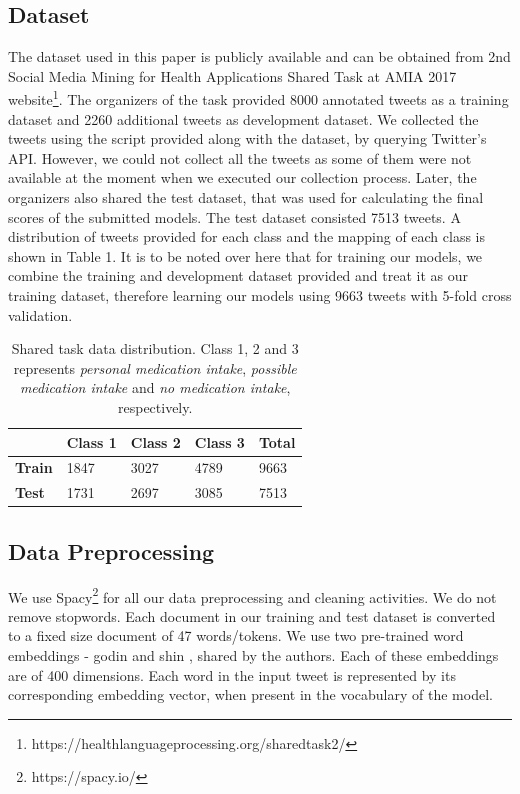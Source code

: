 \documentclass[conference]{IEEEtran}
\begin{document}
\subsection{Dataset \label{dataset}}
The dataset used in this paper is publicly available and can be obtained from 2nd Social Media Mining for Health Applications Shared Task at AMIA 2017 website\footnote{https://healthlanguageprocessing.org/sharedtask2/}.
The organizers of the task provided 8000 annotated tweets as a training dataset and 2260 additional tweets as development dataset. We collected the tweets using the script provided along with the dataset, by querying Twitter’s API. However, we could not collect all the tweets as some of them were not available at the moment when we executed our collection process. Later, the organizers also shared the test dataset, that was used for calculating the final scores of the submitted models. The test dataset consisted 7513 tweets. A distribution of tweets provided for each class and the mapping of each class is shown in Table 1. It is to be noted over here that for training our models, we combine the training and development dataset provided and treat it as our training dataset, therefore learning our models using 9663 tweets with 5-fold cross validation.

\begin{table}[htbp]
\centering
\tabcolsep=0.10cm
\begin{tabular}{|l|l|l|l|l|}
\hline
 & \textbf{Class 1} & \textbf{Class 2} & \textbf{Class 3} & \textbf{Total} \\ \hline
\textbf{Train} & 1847 & 3027 & 4789 & 9663 \\ \hline
\textbf{Test} & 1731 & 2697 & 3085 & 7513 \\ \hline
\end{tabular}
\caption{Shared task data distribution. Class 1, 2 and 3 represents \textit{personal medication intake}, \textit{possible medication intake} and \textit{no medication intake}, respectively.}
\label{dataset}
\end{table}

\subsection{Data Preprocessing}
We use Spacy\footnote{https://spacy.io/}  for all our data preprocessing and cleaning activities. We do not remove stopwords. Each document in our training and test dataset is converted to a fixed size document of 47 words/tokens. We use two pre-trained word embeddings - godin \cite{godin2015multimedia} and shin \cite{shin2016lexicon}, shared by the authors. Each of these embeddings are of 400 dimensions. Each word in the input tweet is represented by its corresponding embedding vector, when present in the vocabulary of the model.
\end{document}
